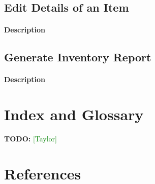\documentclass{article}
\newcommand{\taylor}{\textcolor{green}{[Taylor]}}
\begin{document}
\subsection{Edit Details of an Item}
\paragraph{Description}


\subsection{Generate Inventory Report}
\paragraph{Description}


\section{Index and Glossary}
\textbf{TODO:} \taylor

\section{References}
\end{document}
